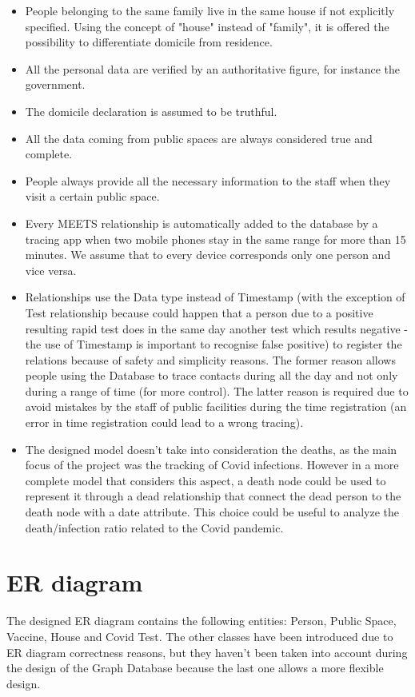 \documentclass{article}
\begin{document}
\begin{itemize}

\item People belonging to the same family live in the same house if not explicitly specified. Using the concept of "house" instead of "family", it is offered the possibility to differentiate domicile from residence.
\item All the personal data are verified by an authoritative figure, for instance the government.
\item The domicile declaration is assumed to be truthful.
\item All the data coming from public spaces are always considered true and complete.
\item People always provide all the necessary information to the staff when they visit a certain public space.
\item Every MEETS relationship is automatically added to the database by a tracing app when two mobile phones stay in the same range for more than 15 minutes. We assume that to every device corresponds only one person and vice versa.
\item Relationships use the Data type instead of Timestamp (with the exception of Test relationship because could happen that a person due to a positive resulting rapid test does in the same day another test which results negative - the use of Timestamp is important to recognise false positive) to register the relations because of safety and simplicity reasons. The former reason allows people using the Database to trace contacts during all the day and not only during a range of time (for more control). The latter reason is required due to avoid mistakes by the staff of public facilities during the time registration (an error in time registration could lead to a wrong tracing).
\item The designed model doesn't take into consideration the deaths, as the main focus of the project was the tracking of Covid infections. However in a more complete model that considers this aspect, a death node could be used to represent it through a dead relationship that connect the dead person to the death node with a date attribute. This choice could be useful to analyze the death/infection ratio related to the Covid pandemic.

\end{itemize}

\section{ER diagram}
The designed ER diagram contains the following entities: Person, Public Space, Vaccine, House and Covid Test. The other classes have been introduced due to ER diagram correctness reasons, but they haven't been taken into account during the design of the Graph Database because the last one allows a more flexible design.
\end{document}
